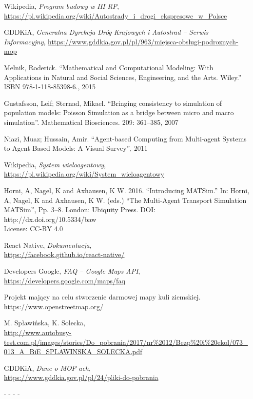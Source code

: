 \begin{thebibliography}{99}

 Wikipedia, \textit{Program budowy w III RP},\\ \url{https://pl.wikipedia.org/wiki/Autostrady\_i\_drogi\_ekspresowe\_w\_Polsce}

 GDDKiA, \textit{Generalna Dyrekcja Dróg Krajowych i Autostrad -- Serwis Informacyjny}, \url{https://www.gddkia.gov.pl/pl/963/miejsca-obslugi-podroznych-mop}

Melnik, Roderick. ``Mathematical and Computational Modeling: With Applications in Natural and Social Sciences, Engineering, and the Arts. Wiley.'' ISBN 978-1-118-85398-6., 2015

Gustafsson, Leif; Sternad, Mikael. ``Bringing consistency to simulation of population models: Poisson Simulation as a bridge between micro and macro simulation''. Mathematical Biosciences. 209: 361–385, 2007

 Niazi, Muaz; Hussain, Amir. ``Agent-based Computing from Multi-agent Systems to Agent-Based Models: A Visual Survey'', 2011

 Wikipedia, \textit{System wieloagentowy},\\ \url{https://pl.wikipedia.org/wiki/System_wieloagentowy}

 Horni, A, Nagel, K and Axhausen, K W. 2016. ``Introducing MATSim.'' In: Horni, A, Nagel, K and
Axhausen, K W. (eds.) ``The Multi-Agent Transport Simulation MATSim'', Pp. 3–8. London: Ubiquity Press. DOI: http://dx.doi.org/10.5334/baw \\ License: CC-BY 4.0

 React Native, \textit{Dokumentacja}, \\ \url{https://facebook.github.io/react-native/}

 Developers Google, \textit{FAQ -- Google Maps API},\\ \url{https://developers.google.com/maps/faq}

  Projekt mający na celu stworzenie darmowej mapy kuli
  ziemskiej. \url{https://www.openstreetmap.org/} 

 M. Spławińska, K. Solecka, \\
\url{http://www.autobusy-test.com.pl/images/stories/Do_pobrania/2017/nr%2012/Bezp%20i%20ekol/073_013_A_BiE_SPLAWINSKA_SOLECKA.pdf} 

 GDDKiA, \textit{Dane o MOP-ach}, \\ \url{https://www.gddkia.gov.pl/pl/24/pliki-do-pobrania}
\end{thebibliography}


-%
-%
-%
-%